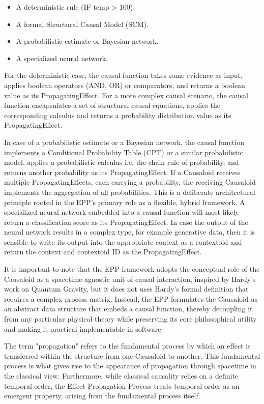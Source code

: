 \begin{itemize}
	\item A deterministic rule (IF temp > 100).
 	\item A formal Structural Causal Model (SCM).
	\item A probabilistic estimate or Bayesian network.
	\item A specialized neural network.
\end{itemize}

For the deterministic case, the causal function takes some evidence as input, applies boolean operators (AND, OR) or comparators, and returns a boolean value as its PropagatingEffect. For a more complex causal scenario, the causal function encapsulates a set of structural causal equations,
applies the corresponding calculus and returns a probability distribution value as its PropagatingEffect.

In case of a probabilistic estimate or a Bayesian network, the causal function implements a Conditional Probability Table (CPT) or a similar probabilistic model, applies a probabilistic calculus i.e. the chain rule of probability, and returns another probability as its PropagatingEffect. If a Causaloid receives multiple PropagatingEffects, each carrying a probability, the receiving Causaloid implements the aggregation of all probabilities. This is a deliberate architectural principle rooted in the EPP's primary role as a flexible, hybrid framework. A specialized neural network embedded into a causal function will most likely return a classification score as its PropagatingEffect. In case the output of the neural network results in a complex type, for example 
generative data, then it is sensible to write its output into the appropriate context as a contextoid and return the context and contextoid ID as the PropagatingEffect. 


It is important to note that the EPP framework adopts the conceptual role of the Causaloid as a spacetime-agnostic unit of causal interaction, inspired by Hardy’s work on Quantum Gravity, but it does not uses Hardy's formal definition that requires a complex process matrix.  Instead, the EPP formulates the Causaloid as an abstract data structure that embeds a causal function, thereby decoupling it from any particular physical theory while preserving its core philosophical utility and making it practical implementable in software.

The term "propagation" refers to the fundamental process by which an effect is transferred within the structure from one Causaloid to another. This fundamental process is what gives rise to the appearance of propagation through spacetime in the classical view. Furthermore, while classical causality relies on a definite temporal order, the Effect Propagation Process treats temporal order as an emergent property, arising from the fundamental process itself.

